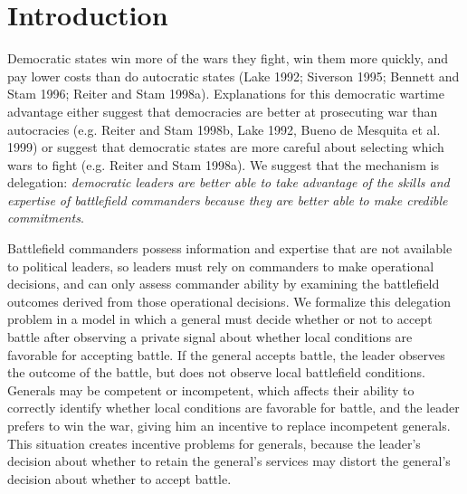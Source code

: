 \documentclass[11pt,]{article}
\begin{document}
\section{Introduction}
\noindent Democratic states win more of the wars they fight, win them more quickly, and pay lower costs than do autocratic states (Lake 1992; Siverson 1995; Bennett and Stam 1996; Reiter and Stam 1998a). Explanations for this democratic wartime advantage either suggest that democracies are better at prosecuting war than autocracies (e.g. Reiter and Stam 1998b, Lake 1992, Bueno de Mesquita et al. 1999) or suggest that democratic states are more careful about selecting which wars to fight (e.g. Reiter and Stam 1998a).  We suggest that the mechanism is delegation: \textit{democratic leaders are better able to take advantage of the skills and expertise of battlefield commanders because they are better able to make credible commitments}.  %

Battlefield commanders possess information and expertise that are not available to political leaders, so leaders must rely on commanders to make operational decisions, and can only assess commander ability by examining the battlefield outcomes derived from those operational decisions.  We formalize this delegation problem in a model in which a general must decide whether or not to accept battle after observing a private signal about whether local conditions are favorable for accepting battle. If the general accepts battle, the leader observes the outcome of the battle, but does not observe local battlefield conditions. Generals may be competent or incompetent, which affects their ability to correctly identify whether local conditions are favorable for battle, and the leader prefers to win the war, giving him an incentive to replace incompetent generals. This situation creates incentive problems for generals, because the leader's decision about whether to retain the general's services may distort the general's decision about whether to accept battle.  
\end{document}
